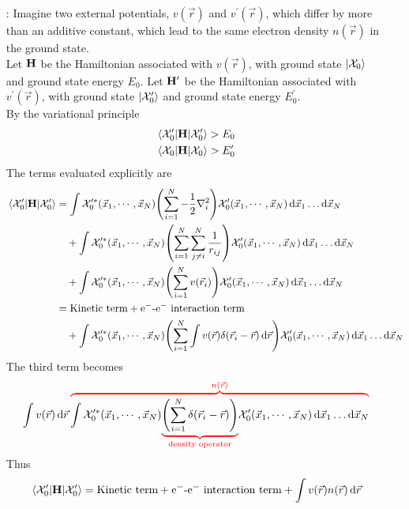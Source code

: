 \documentclass[12pt,a4paper,titlepage]{article}
\newcommand\hruleMod{%
	\vskip12pt
	\nointerlineskip
	{\color{lightgray}\leaders\vrule width \textwidth\vskip0.4pt}
	\nointerlineskip
	\vskip12pt
}
\newcommand{\aside}[3][]{ %
	\ifthenelse{\equal{#1}{}}{\hruleMod}{}
	\begin{itemize}[align=left,labelindent=0em,labelwidth=3em,labelsep*=0.5em,leftmargin=!]
		\item[\ul{#2}:]{#3}
	\end{itemize}
	\ifthenelse{\equal{#1}{}}{\hruleMod}{}
}
\newcommand{\trm}[1]{\textrm{#1}} %
\newcommand{\ul}[1]{\underline{\smash{#1}}} %
\newcommand{\Chi}{\mathcal{X}} %
\begin{document}
\aside{Proof}{Imagine two external potentials, $v(\vec{r})$ and $v^{\prime}(\vec{r})$, which differ by more than an additive constant, which lead to the same electron density $n(\vec{r})$ in the ground state.\\

Let $\vb{H}$ be the Hamiltonian associated with $v(\vec{r})$, with ground state $\ket{\Chi_{0}}$ and ground state energy $E_{0}$. Let $\vb{H}^{\prime}$ be the Hamiltonian associated with $v^{\prime}(\vec{r})$, with ground state $\ket{\Chi_{0}^{\prime}}$ and ground state energy $E_{0}^{\prime}$.\\

By the variational principle
\begin{equation}
\begin{aligned}
\mel{\Chi_{0}^{\prime}}{\vb{H}}{\Chi_{0}^{\prime}}&>E_{0}\\
\mel{\Chi_{0}}{\vb{H}}{\Chi_{0}}&>E_{0}^{\prime}
\end{aligned}
\end{equation}
The terms evaluated explicitly are
\begin{equation}
\begin{aligned}
\mel{\Chi_{0}^{\prime}}{\vb{H}}{\Chi_{0}^{\prime}}&=\int\Chi_{0}^{\prime *}(\vec{x}_{1},\cdots,\vec{x}_{N})\qty(\sum_{i=1}^{N}-\frac{1}{2}\nabla_{i}^{2})\Chi_{0}^{\prime}(\vec{x}_{1},\cdots,\vec{x}_{N})\dd{\vec{x}_{1}}\ldots\dd{\vec{x}_{N}}\\
&\quad+\int\Chi_{0}^{\prime *}(\vec{x}_{1},\cdots,\vec{x}_{N})\qty(\sum_{i=1}^{N}\sum_{j\neq i}^{N}\frac{1}{r_{ij}})\Chi_{0}^{\prime}(\vec{x}_{1},\cdots,\vec{x}_{N})\dd{\vec{x}_{1}}\ldots\dd{\vec{x}_{N}}\\
&\quad+\int\Chi_{0}^{\prime *}(\vec{x}_{1},\cdots,\vec{x}_{N})\qty(\sum_{i=1}^{N}v(\vec{r}_{i}))\Chi_{0}^{\prime}(\vec{x}_{1},\cdots,\vec{x}_{N})\dd{\vec{x}_{1}}\ldots\dd{\vec{x}_{N}}\\
&=\trm{Kinetic term} + \trm{e$^{-}$-e$^{-}$ interaction term}\\
&\quad+\int\Chi_{0}^{\prime *}(\vec{x}_{1},\cdots,\vec{x}_{N})\qty(\sum_{i=1}^{N}\int v(\vec{r})\delta(\vec{r}_{i}-\vec{r})\dd{\vec{r}})\Chi_{0}^{\prime}(\vec{x}_{1},\cdots,\vec{x}_{N})\dd{\vec{x}_{1}}\ldots\dd{\vec{x}_{N}}
\end{aligned}
\end{equation}
The third term becomes
\begin{equation}
\int v(\vec{r})\dd{\vec{r}}{\color{red}\overbrace{\color{black}\int\Chi_{0}^{\prime *}(\vec{x}_{1},\cdots,\vec{x}_{N}){\color{red}\underbrace{\color{black}\qty(\sum_{i=1}^{N}\delta(\vec{r}_{i}-\vec{r}))}_{\mathclap{\trm{density operator}}}}\Chi_{0}^{\prime}(\vec{x}_{1},\cdots,\vec{x}_{N})\dd{\vec{x}_{1}}\ldots\dd{\vec{x}_{N}}}^{n(\vec{r})}}
\end{equation}
Thus
\begin{equation}
\mel{\Chi_{0}^{\prime}}{\vb{H}}{\Chi_{0}^{\prime}}=\trm{Kinetic term} + \trm{e$^{-}$-e$^{-}$ interaction term}+\int v(\vec{r})n(\vec{r})\dd{\vec{r}}
\end{equation}
}
\end{document}
